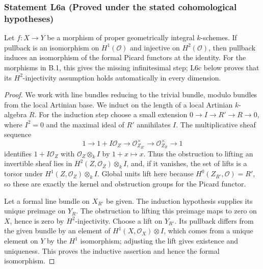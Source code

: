 \subsubsection*{Statement L6a (Proved under the stated cohomological hypotheses)}
Let $f:X\to Y$ be a morphism of proper geometrically integral
$k$-schemes.  If pullback is an isomorphism on $H^1(\mathcal O)$
and injective on $H^2(\mathcal O)$, then pullback induces an
isomorphism of the formal Picard functors at the identity.
For the morphisms in B.1, this gives the missing infinitesimal
step; L6c below proves that its $H^2$-injectivity
assumption holds automatically in every dimension.
\begin{proof}
We work with line bundles reducing to the trivial bundle,
modulo bundles from the local Artinian base.  We induct on
the length of a local Artinian $k$-algebra $R$.  For the
induction step choose a small extension
$0\to I\to R'\to R\to0$, where $I^2=0$ and the maximal
ideal of $R'$ annihilates $I$.  The multiplicative sheaf
sequence
\[
 1\longrightarrow 1+I\mathcal O_Z
 \longrightarrow\mathcal O_{Z_{R'}}^\times
 \longrightarrow\mathcal O_{Z_R}^\times
 \longrightarrow1
\]
identifies $1+I\mathcal O_Z$ with
$\mathcal O_Z\otimes_kI$ by $1+x\mapsto x$.
Thus the obstruction to lifting an invertible sheaf lies
in $H^2(Z,\mathcal O_Z)\otimes_kI$, and, if it vanishes,
the set of lifts is a torsor under
$H^1(Z,\mathcal O_Z)\otimes_kI$.  Global units lift here
because $H^0(Z_{R'},\mathcal O)=R'$, so these are exactly
the kernel and obstruction groups for the Picard functor.

Let a formal line bundle on $X_{R'}$ be given.  The
induction hypothesis supplies its unique preimage on
$Y_R$.  The obstruction to lifting this preimage maps
to zero on $X$, hence is zero by $H^2$-injectivity.
Choose a lift on $Y_{R'}$.  Its pullback differs from
the given bundle by an element of
$H^1(X,\mathcal O_X)\otimes I$, which comes from a unique
element on $Y$ by the $H^1$ isomorphism; adjusting the
lift gives existence and uniqueness.  This proves the
inductive assertion and hence the formal isomorphism.
\end{proof}

